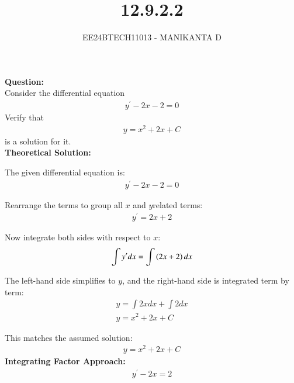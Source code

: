 \documentclass[journal]{IEEEtran}
\begin{document}

\vspace{3cm}

\title{12.9.2.2}
\author{EE24BTECH11013 - MANIKANTA D}
{\let\newpage\relax\maketitle}

\renewcommand{\thefigure}{\theenumi}
\renewcommand{\thetable}{\theenumi}
\setlength{\intextsep}{10pt} %


\renewcommand{\thetable}{\theenumi}

\textbf{Question:}\\
Consider the differential equation 
\begin{align}
    y^\prime - 2x - 2 = 0
\end{align}
Verify that
\begin{align}
    y = x^2 + 2x + C
\end{align}
is a solution for it.\\
\textbf{Theoretical Solution:}

The given differential equation is:
\begin{align}
    y^\prime - 2x - 2 = 0
\end{align}

Rearrange the terms to group all  $x$ and $y$related terms:
\begin{align}
    y^\prime = 2x + 2
\end{align}

Now integrate both sides with respect to $x$:
\begin{align}
    \int y^\prime dx = \int \left(2x + 2\right) dx
\end{align}

The left-hand side simplifies to  $y$, and the right-hand side is integrated term by term:
\begin{align}
    y = \int 2x dx + \int 2 dx \\
    y = x^2 + 2x + C
\end{align}

This matches the assumed solution:
\begin{align}
    y = x^2 + 2x + C
\end{align}
\textbf{Integrating Factor Approach:}
\begin{align}
    y^\prime - 2x = 2
\end{align}
\end{document}
